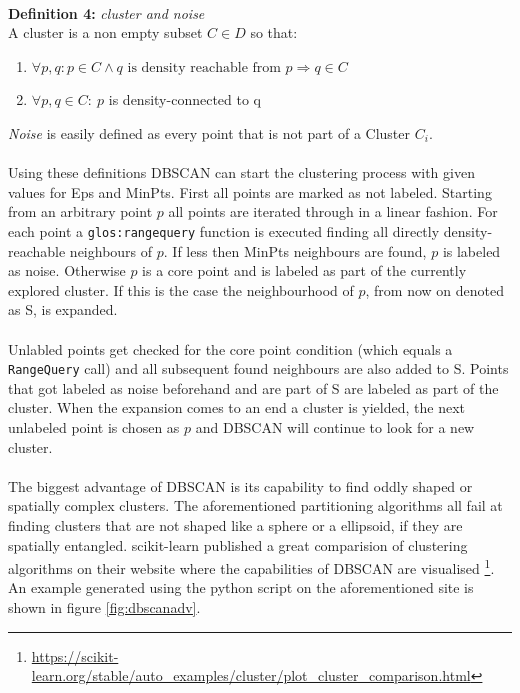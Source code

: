 \ \\
\textbf{Definition 4:} \textit{cluster and noise}\\
A cluster is a non empty subset $C \in D$ so that:
\begin{enumerate}
    \item $\forall p, q: p \in C \wedge q \text{ is density reachable from } p \Rightarrow q \in C$
    \item $\forall p, q \in C: \ p$ is density-connected to q
\end{enumerate}
\textit{Noise} is easily defined as every point that is not part of a Cluster $C_i$.\\
\ \\
Using these definitions DBSCAN can start the clustering process with given values for Eps and MinPts. First all points are marked as not labeled. Starting from an arbitrary point $p$ all points are iterated through in a linear fashion. For each point a \texttt{\Gls{glos:rangequery}} function is executed finding all directly density-reachable neighbours of $p$. If less then MinPts neighbours are found, $p$ is labeled as noise. Otherwise $p$ is a core point and is labeled as part of the currently explored cluster. If this is the case the neighbourhood of $p$, from now on denoted as S, is expanded.\\
\ \\
Unlabled points get checked for the core point condition (which equals a \texttt{RangeQuery} call) and all subsequent found neighbours are also added to S. Points that got labeled as noise beforehand and are part of S are labeled as part of the cluster.
When the expansion comes to an end a cluster is yielded, the next unlabeled point is chosen as $p$ and DBSCAN will continue to look for a new cluster.\\
\ \\
The biggest advantage of DBSCAN is its capability to find oddly shaped or spatially complex clusters. The aforementioned partitioning algorithms all fail at finding clusters that are not shaped like a sphere or a ellipsoid, if they are spatially entangled. scikit-learn published a great comparision of clustering algorithms on their website where the capabilities of DBSCAN are visualised \footnote{\url{https://scikit-learn.org/stable/auto_examples/cluster/plot_cluster_comparison.html}}. An example generated using the python script on the aforementioned site is shown in figure \ref{fig:dbscanadv}.

